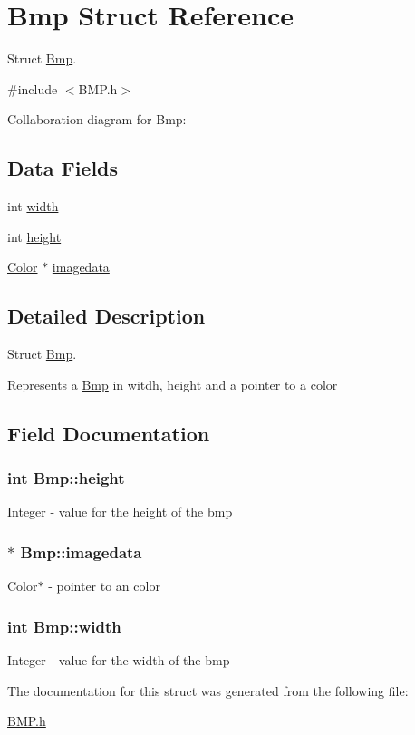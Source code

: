 \hypertarget{structBmp}{\section{Bmp Struct Reference}
\label{structBmp}
}


Struct \hyperlink{structBmp}{Bmp}.  




{\ttfamily \#include $<$B\-M\-P.\-h$>$}



Collaboration diagram for Bmp\-:
\subsection*{Data Fields}
\begin{DoxyCompactItemize}
\item 
int \hyperlink{structBmp_ae5901fc7980394c5a0a9173103550cb9}{width}
\item 
int \hyperlink{structBmp_ab79e215f3eb038b8f15632fecf6c3745}{height}
\item 
\hyperlink{structColor}{Color} $\ast$ \hyperlink{structBmp_a24da5d65fadd970a4be260ff6ab399f1}{imagedata}
\end{DoxyCompactItemize}


\subsection{Detailed Description}
Struct \hyperlink{structBmp}{Bmp}. 

Represents a \hyperlink{structBmp}{Bmp} in witdh, height and a pointer to a color 

\subsection{Field Documentation}
\hypertarget{structBmp_ab79e215f3eb038b8f15632fecf6c3745}{
\subsubsection[{height}]{\setlength{\rightskip}{0pt plus 5cm}int Bmp\-::height}}\label{structBmp_ab79e215f3eb038b8f15632fecf6c3745}
Integer -\/ value for the height of the bmp \hypertarget{structBmp_a24da5d65fadd970a4be260ff6ab399f1}{
\subsubsection[{imagedata}]{$\ast$ Bmp\-::imagedata}}\label{structBmp_a24da5d65fadd970a4be260ff6ab399f1}
Color$\ast$ -\/ pointer to an color \hypertarget{structBmp_ae5901fc7980394c5a0a9173103550cb9}{
\subsubsection[{width}]{\setlength{\rightskip}{0pt plus 5cm}int Bmp\-::width}}\label{structBmp_ae5901fc7980394c5a0a9173103550cb9}
Integer -\/ value for the width of the bmp 

The documentation for this struct was generated from the following file\-:\begin{DoxyCompactItemize}
\item 
\hyperlink{BMP_8h}{B\-M\-P.\-h}\end{DoxyCompactItemize}
